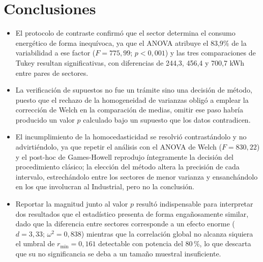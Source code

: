 \section{Conclusiones}
    \begin{itemize}
        \item El protocolo de contraste confirmó que el sector determina el consumo
        energético de forma inequívoca, ya que el ANOVA atribuye el 83,9\% de la
        variabilidad a ese factor ($F = 775{,}99$; $p < 0{,}001$) y las tres
        comparaciones de Tukey resultan significativas, con diferencias de 244,3,
        456,4 y 700,7 kWh entre pares de sectores.

        \vspace{10pt}

        \item La verificación de supuestos no fue un trámite sino una decisión de
        método, puesto que el rechazo de la homogeneidad de varianzas obligó a
        emplear la corrección de Welch en la comparación de medias, omitir ese paso
        habría producido un valor $p$ calculado bajo un supuesto que los datos
        contradicen.

        \vspace{10pt}

        \item El incumplimiento de la homocedasticidad se resolvió contrastándolo y
        no advirtiéndolo, ya que repetir el análisis con el ANOVA de Welch
        ($F = 830{,}22$) y el post-hoc de Games-Howell reprodujo íntegramente la
        decisión del procedimiento clásico; la elección del método altera la
        precisión de cada intervalo, estrechándolo entre los sectores de menor
        varianza y ensanchándolo en los que involucran al Industrial, pero no la
        conclusión.

        \vspace{10pt}

        \item Reportar la magnitud junto al valor $p$ resultó indispensable para
        interpretar dos resultados que el estadístico presenta de forma engañosamente
        similar, dado que la diferencia entre sectores corresponde a un efecto
        enorme ($d = 3{,}33$; $\omega^2 = 0{,}838$) mientras que la correlación
        global no alcanza siquiera el umbral de $r_{\min} = 0{,}161$ detectable con
        potencia del 80\,\%, lo que descarta que su no significancia se deba a un
        tamaño muestral insuficiente.


\end{itemize}
